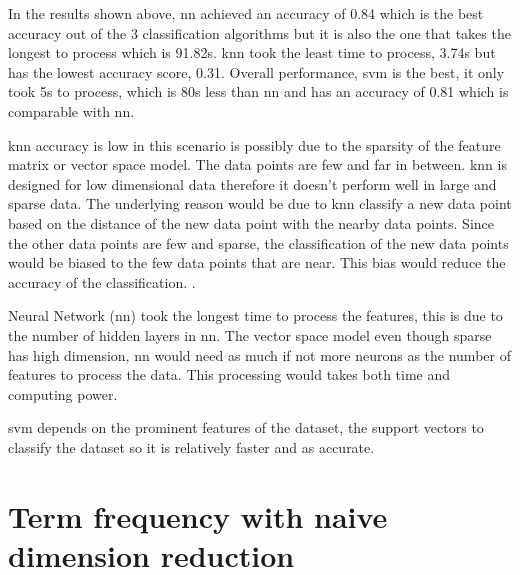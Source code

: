 In the results shown above, \ac{nn} achieved an accuracy of 0.84 which is the best accuracy out of the 3 classification algorithms but it is also the one that takes the longest to process which is 91.82s. \Ac{knn} took the least time to process, 3.74s but has the lowest accuracy score, 0.31. Overall performance, \ac{svm} is the best, it only took 5s to process, which is 80s less than \ac{nn} and has an accuracy of 0.81 which is comparable with \ac{nn}. 

\Ac{knn} accuracy is low in this scenario is possibly due to the sparsity of the feature matrix or vector space model. The data points are few and far in between. \Ac{knn} is designed for low dimensional data therefore it doesn't perform well in large and sparse data. The underlying reason would be due to \ac{knn} classify a new data point based on the distance of the new data point with the nearby data points. Since the other data points are few and sparse, the classification of the new data points would be biased to the few data points that are near. This bias would reduce the accuracy of the classification. \cite{knnDrawback}.

Neural Network (\ac{nn}) took the longest time to process the features, this is due to the number of hidden layers in \ac{nn}. The vector space model even though sparse has high dimension, \ac{nn} would need as much if not more neurons as the number of features to process the data. This processing would takes both time and computing power.

\Ac{svm} depends on the prominent features of the dataset, the support vectors to classify the dataset so it is relatively faster and as accurate.

\section{Term frequency with naive dimension reduction}

